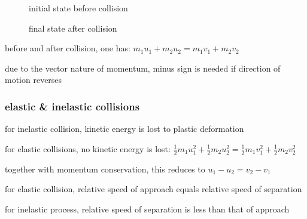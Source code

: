 \begin{figure}[htp]
\noindent\begin{minipage}{0.5\textwidth}
	\begin{center}
		
		initial state before collision
	\end{center}
\end{minipage}
\begin{minipage}{0.5\textwidth}
	\begin{center}
		
		final state after collision
	\end{center}
\end{minipage}
\end{figure}

before and after collision, one has: $\boxed{m_1u_1 + m_2u_2 = m_1v_1 + m_2v_2}$

due to the vector nature of momentum, minus sign is needed if direction of motion reverses

\subsubsection{elastic \& inelastic collisions}

for inelastic collision, kinetic energy is lost to plastic deformation

for elastic collisions, no kinetic energy is lost: $\boxed{\frac{1}{2}m_1 u_1^2 + \frac{1}{2}m_2 u_2^2 = \frac{1}{2}m_1 v_1^2 + \frac{1}{2}m_2 v_2^2}$

together with momentum conservation, this reduces to $\boxed{u_1 - u_2 = v_2 - v_1}$

for elastic collision, relative speed of approach equals relative speed of separation 

for inelastic process, relative speed of separation is less than that of approach

